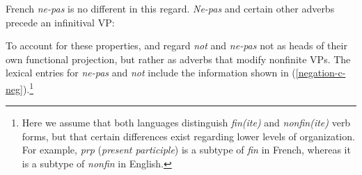 \documentclass[output=paper
                ,modfonts
                ,nonflat
	        ,collection
	        ,collectionchapter
	        ,collectiontoclongg
 	        ,biblatex
                ,babelshorthands
                ,newtxmath
                ,draftmode
                ,colorlinks, citecolor=brown
]{./langsci/langscibook}
\begin{document}
{\begin{exe}
\begin{xlist}
\begin{exe}
\begin{xlist}
\eal\label{negation-31}
\zl

\noindent
French \textit{ne-pas} is no different in this regard.  \textit{Ne-pas} and
certain other adverbs precede an infinitival VP:

\eal
{}
\zl

To account for these properties, \citet{Kim:00} and \citet{KS:02} regard \textit{not} and \textit{ne-pas} not as heads of their own functional projection, but rather as adverbs that modify
nonfinite VPs. The lexical entries for \textit{ne-pas} and \textit{not} include the
information shown in (\ref{negation-c-neg}).\footnote{Here we assume that both languages
distinguish \textit{fin(ite)} and \textit{nonfin(ite)} verb forms, but that
certain differences exist regarding lower levels of organization. For example,
\textit{prp} (\textit{present participle}) is a subtype of \textit{fin} in French,
whereas it is a subtype of \textit{nonfin} in English.}

%


\end{xlist}
\end{exe}
\end{xlist}
\end{exe}}
\end{document}
